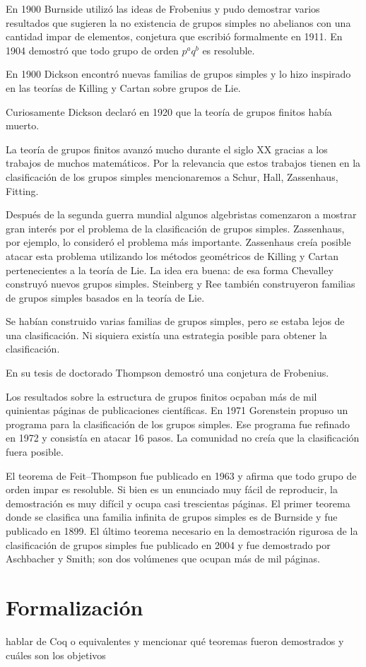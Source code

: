 En 1900 Burnside utilizó las ideas de Frobenius y pudo demostrar varios
resultados que sugieren la no existencia de grupos simples no abelianos con una
cantidad impar de elementos, conjetura que escribió formalmente en 1911. En
1904 demostró que todo grupo de orden $p^aq^b$ es resoluble. 

En 1900 Dickson encontró nuevas familias de grupos simples y lo hizo inspirado en
las teorías de Killing y Cartan sobre grupos de Lie. 

Curiosamente Dickson declaró en 1920 que la teoría de grupos finitos había muerto. 

La teoría de grupos finitos avanzó mucho durante el siglo XX gracias a los
trabajos de muchos matemáticos. Por la relevancia que estos trabajos tienen en
la clasificación de los grupos simples mencionaremos a Schur, Hall, Zassenhaus,
Fitting.

Después de la segunda guerra mundial algunos algebristas comenzaron a mostrar gran interés por el problema de la clasificación de grupos simples. Zassenhaus, por ejemplo, 
lo consideró el problema más importante. Zassenhaus creía posible atacar esta problema utilizando los métodos geométricos de Killing y Cartan pertenecientes a la teoría de Lie. La idea
era buena: de esa forma Chevalley construyó nuevos grupos simples. Steinberg y Ree también construyeron familias de grupos simples basados en la teoría de Lie. 

Se habían construido varias familias de grupos simples, pero 
se estaba lejos de una clasificación. Ni siquiera existía una estrategia posible para obtener la clasificación. 

En su tesis de doctorado Thompson demostró una conjetura de Frobenius.

Los resultados sobre la estructura de grupos finitos ocpaban más de mil quinientas páginas de publicaciones científicas. En 1971 Gorenstein propuso un programa para la clasificación de los grupos simples. 
Ese programa fue refinado en 1972 y consistía en atacar 16 pasos. La comunidad no creía que la clasificación fuera posible.

El teorema de Feit--Thompson fue publicado en 1963 y afirma que todo grupo de orden impar es resoluble. Si bien es un enunciado muy fácil de reproducir, la demostración es muy difícil y ocupa casi trescientas páginas. 
El primer teorema donde se clasifica una familia infinita de grupos simples 
es de Burnside y fue publicado en 1899. El último teorema necesario en la demostración rigurosa de la clasificación de grupos simples fue publicado en 2004 
y fue demostrado por Aschbacher y Smith; son dos volúmenes que ocupan más de mil páginas. 


\section*{Formalización}

hablar de Coq o equivalentes y mencionar qué teoremas fueron demostrados y cuáles son los objetivos
